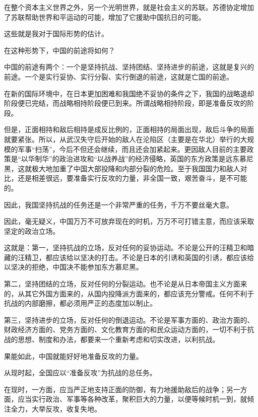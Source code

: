 在整个资本主义世界之外，另一个光明世界，就是社会主义的苏联。苏德协定增加了苏联帮助世界和平运动的可能，增加了它援助中国抗日的可能。

这些就是我对于国际形势的估计。

在这种形势下，中国的前途将如何？

中国的前途有两个：一个是坚持抗战、坚持团结、坚持进步的前途，这就是复兴的前途。一个是实行妥协、实行分裂、实行倒退的前途，这就是亡国的前途。

在新的国际环境中，在日本更加困难和我国绝不妥协的条件之下，我国的战略退却阶段便已完结，而战略相持阶段便已到来。所谓战略相持阶段，即是准备反攻的阶段。

但是，正面相持和敌后相持是成反比例的，正面相持的局面出现，敌后斗争的局面就要紧张。所以，从武汉失守后开始的敌人在沦陷区（主要是在华北）举行的大规模的军事“扫荡”，今后不但还会继续，而且还会加紧起来。更因敌人目前的主要政策是“以华制华”的政治进攻和“以战养战”的经济侵略，英国的东方政策是远东慕尼黑，这就极大地加重了中国大部投降和内部分裂的危险。至于我国国力和敌人对比，还是相差很远，要准备实行反攻的力量，非全国一致，艰苦奋斗，是不可能的。

因此，我国坚持抗战的任务还是一个非常严重的任务，千万不要丝毫大意。

因此，毫无疑义，中国万万不可放弃现在的时机，万万不可打错主意，而应该采取坚定的政治立场。

这就是：第一，坚持抗战的立场，反对任何的妥协运动。不论是公开的汪精卫和暗藏的汪精卫，都应该给以坚决的打击。不论是日本的引诱和英国的引诱，都应该给以坚决的拒绝，中国决不能参加东方慕尼黑。

第二，坚持团结的立场，反对任何的分裂运动。也不论是从日本帝国主义方面来的，从其它外国方面来的，从国内投降派方面来的，都应该充分警戒。任何不利于抗战的内部磨擦，都必须用严正的态度加以制止。

第三，坚持进步的立场，反对任何的倒退运动。不论是军事方面的、政治方面的、财政经济方面的、党务方面的、文化教育方面的和民众运动方面的，一切不利于抗战的思想、制度和办法，都要来一个重新考虑和切实改进，以利抗战。

果能如此，中国就能好好地准备反攻的力量。

从现时起，全国应以“准备反攻”为抗战的总任务。

在现时，一方面，应当严正地支持正面的防御，有力地援助敌后的战争；另一方面，应当实行政治、军事等各种改革，聚积巨大的力量，以便等候时机一到，就倾注全力，大举反攻，收复失地。


